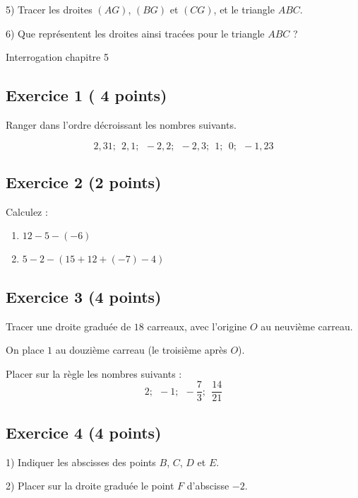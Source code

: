 \documentclass[14pt]{extreport}
\theoremstyle{plain}
\begin{document}
5) Tracer les droites $(AG)$, $(BG)$ et $(CG)$, et le triangle $ABC$. 

6) Que représentent les droites ainsi tracées pour le triangle $ABC$ ?
\newpage 

\begin{center}{\Large Interrogation chapitre 5}\end{center}

\subsection*{Exercice 1 ( 4 points)}
 
 Ranger dans l'ordre décroissant les nombres suivants. 
 

\[ 2,31 ; \ \ 2,1 ; \ \ -2,2 ; \ \ -2,3 ; \ \ 1 ; \ \ 0 ; \ \ -1,23 \]
 \subsection*{Exercice 2 (2 points)}
 
 Calculez : \begin{enumerate}
 \item $12 - 5 - (-6) $
 \item $ 5 - 2 - (15 + 12 + ( -7) - 4) $
 \end{enumerate}
 
\subsection*{Exercice 3 (4 points)}
Tracer une droite graduée de $18$ carreaux, avec l'origine $O$ au neuvième carreau. 

On place $1$ au douzième carreau (le troisième après $O$). 

Placer sur la règle les nombres suivants :
\[ 2 ; \ \ -1 ; \ \ -\frac73 ; \ \ \frac{14}{21}\]


\subsection*{Exercice 4 (4 points)} 
 
1) Indiquer les abscisses des points $B$, $C$, $D$ et $E$.
 
2) Placer sur la droite graduée le point $F$ d'abscisse $-2$. 
\end{document}
